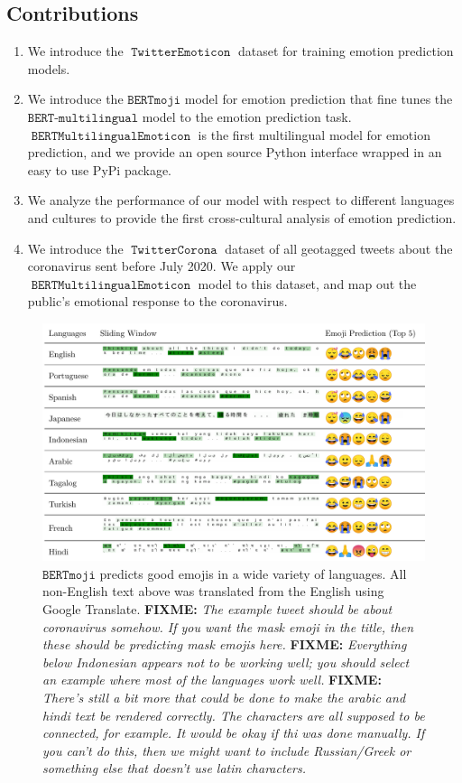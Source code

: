 \documentclass[11pt]{article}
\newcommand{\fixme}[1]{{\color{red} \textbf{FIXME:} {\textit {#1}}}}
\newcommand{\bertmoji}{\texttt{BERTmoji}}
\newcommand{\bert}{\texttt{BERT-multilingual}}
\DeclareMathOperator{\model}{\texttt{BERTMultilingualEmoticon}}
\DeclareMathOperator{\emoticon}{\texttt{TwitterEmoticon}}
\DeclareMathOperator{\corona}{\texttt{TwitterCorona}}
\begin{document}
{\color{blue} \lipsum[1-4] }

\subsection{Contributions}

\begin{enumerate}
    \item 
        We introduce the $\emoticon$ dataset for training emotion prediction models.
    \item
        We introduce the $\bertmoji$ model for emotion prediction that fine tunes the $\bert$ model \citep{devlin2018bert} to the emotion prediction task. 
        $\model$ is the first multilingual model for emotion prediction,
        and we provide an open source Python interface wrapped in an easy to use PyPi package.
    \item
        We analyze the performance of our model with respect to different languages and cultures to provide the first cross-cultural analysis of emotion prediction.
    \item 
        We introduce the $\corona$ dataset of all geotagged tweets about the coronavirus sent before July 2020.
        We apply our $\model$ model to this dataset,
        and map out the public's emotional response to the coronavirus.
\end{enumerate}

\begin{figure}
    \centering
    \includegraphics[width=\textwidth]{images/PREDICTMOJI.pdf}
    \caption{
        $\bertmoji$ predicts good emojis in a wide variety of languages.
        All non-English text above was translated from the English using Google Translate.
        \fixme{The example tweet should be about coronavirus somehow. If you want the mask emoji in the title, then these should be predicting mask emojis here.}
        \fixme{Everything below Indonesian appears not to be working well; you should select an example where most of the languages work well.}
        \fixme{There's still a bit more that could be done to make the arabic and hindi text be rendered correctly.  The characters are all supposed to be connected, for example.  It would be okay if thi was done manually.  If you can't do this, then we might want to include Russian/Greek or something else that doesn't use latin characters.}
     }
    \label{fig:prediction_top10_langs}
\end{figure}
\end{document}
